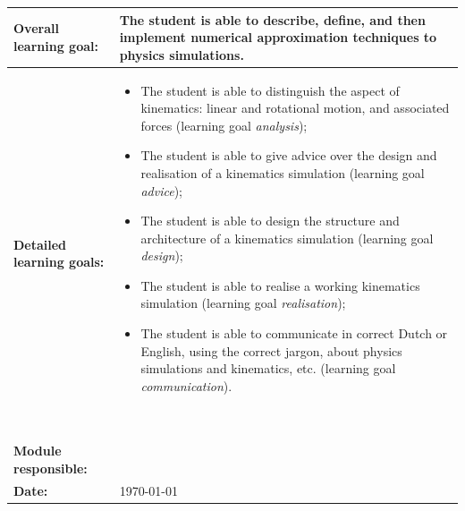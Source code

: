 \begin{tabularx}{\textwidth}{|>{\columncolor{lichtGrijs}} p{}|X|}
	\hline
	\textbf{Overall learning goal:}&
		The student is able to describe, define, and then implement numerical approximation techniques to physics simulations. \\
	\hline
	\textbf{Detailed learning goals:}&
	\begin{itemize}
		\item The student is able to distinguish the aspect of kinematics: linear and rotational motion, and associated forces (learning goal \textit{analysis});
		\item The student is able to give advice over the design and realisation of a kinematics simulation (learning goal \textit{advice});
		\item The student is able to design the structure and architecture of a kinematics simulation (learning goal \textit{design});
		\item The student is able to realise a working kinematics simulation (learning goal \textit{realisation});
		\item The student is able to communicate in correct Dutch or English, using the correct jargon, about physics simulations and kinematics, etc. (learning goal \textit{communication}).
	\end{itemize}
	\ \\
	\hline
	\textbf{Module responsible:} & \author\\
	\hline
	\textbf{Date:} & \today \\
	\hline
\end{tabularx}
\newpage
